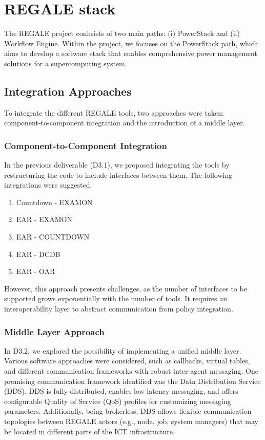 \newpage
\section{REGALE stack}
The REGALE project conhsists of two main paths: (i) PowerStack and (ii) Workflow Engine. Within the project, we focuses on the PowerStack path, which aims to develop a software stack that enables comprehensive power management solutions for a supercomputing system.

\subsection{Integration Approaches}
To integrate the different REGALE tools, two approaches were taken: component-to-component integration and the introduction of a middle layer.

\subsubsection{Component-to-Component Integration}
In the previous deliverable (D3.1), we proposed integrating the tools by restructuring the code to include interfaces between them. The following integrations were suggested:
\begin{enumerate}
\item Countdown - EXAMON
\item EAR - EXAMON
\item EAR - COUNTDOWN
\item EAR - DCDB
\item EAR - OAR
\end{enumerate}
However, this approach presents challenges, as the number of interfaces to be supported grows exponentially with the number of tools. It requires an interoperability layer to abstract communication from policy integration.

\subsubsection{Middle Layer Approach}
In D3.2, we explored the possibility of implementing a unified middle layer. Various software approaches were considered, such as callbacks, virtual tables, and different communication frameworks with robust inter-agent messaging. One promising communication framework identified was the Data Distribution Service (DDS). DDS is fully distributed, enables low-latency messaging, and offers configurable Quality of Service (QoS) profiles for customizing messaging parameters. Additionally, being brokerless, DDS allows flexible communication topologies between REGALE actors (e.g., node, job, system managers) that may be located in different parts of the ICT infrastructure.

